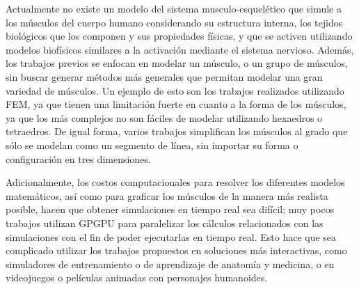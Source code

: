 Actualmente no existe un modelo del sistema musculo-esquelético que simule a los músculos del cuerpo humano considerando su estructura interna, los tejidos biológicos que los componen y sus propiedades físicas, y que se activen utilizando modelos biofísicos similares a la activación mediante el sistema nervioso. Además, los trabajos previos se enfocan en modelar un músculo, o un grupo de músculos, sin buscar generar métodos más generales que permitan modelar una gran variedad de músculos.  Un ejemplo de esto son los trabajos realizados utilizando FEM, ya que tienen una limitación fuerte en cuanto a la forma de los músculos, ya que los más complejos no son fáciles de modelar utilizando hexaedros o tetraedros. De igual forma, varios trabajos simplifican los músculos al grado que sólo se modelan como un segmento de línea, sin importar su forma o configuración en tres dimensiones.

Adicionalmente, los costos computacionales para resolver los diferentes modelos matemáticos, así como para graficar los músculos de la manera más realista posible, hacen que obtener simulaciones en tiempo real sea difícil; muy pocos trabajos utilizan GPGPU para paralelizar los cálculos relacionados con las simulaciones con el fin de poder ejecutarlas en tiempo real. Esto hace que sea complicado utilizar los trabajos propuestos en soluciones más interactivas, como simuladores de entrenamiento o de aprendizaje de anatomía y medicina, o en videojuegos o películas animadas con personajes humanoides. 

